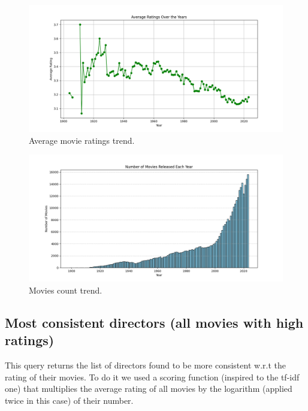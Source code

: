 \documentclass{Configuration_Files/PoliMi3i_thesis}
\begin{document}
\begin{figure}[!h]
  \centering
  \includegraphics[width=\textwidth]{Project Template/letterboxd/visualization/average_ratings_trend.png}
  \caption{Average movie ratings trend.}
  \label{fig:ratings_trend}
\end{figure}

\begin{figure}[!h]
  \centering
  \includegraphics[width=\textwidth]{Project Template/letterboxd/visualization/movies_count_trend.png}
  \caption{Movies count trend.}
  \label{fig:movies_count_trend}
\end{figure}


\subsection{Most consistent directors (all movies with high ratings)}

This query returns the list of directors found to be more consistent w.r.t the rating of their movies. To do it we used a scoring function (inspired to the tf-idf one) that multiplies the average rating of all movies by the logarithm (applied twice in this case) of their number.

\inputminted[frame=single,framesep=10pt,breaklines]{cypher}{letterboxd/queries/query2.cypher}
\end{document}
